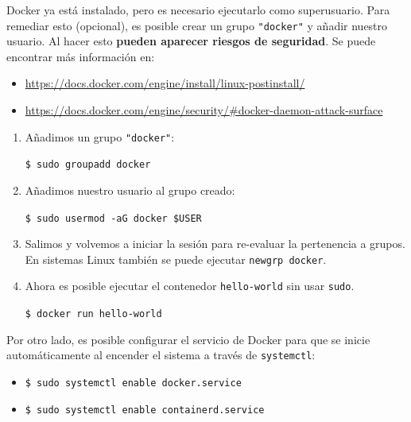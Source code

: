 Docker ya está instalado, pero es necesario ejecutarlo como superusuario. Para remediar esto (opcional), es posible crear un grupo \texttt{"docker"} y añadir nuestro usuario. Al hacer esto \textbf{pueden aparecer riesgos de seguridad}. Se puede encontrar más información en:

\begin{itemize}

\item \url{https://docs.docker.com/engine/install/linux-postinstall/}

\item \url{https://docs.docker.com/engine/security/#docker-daemon-attack-surface}

\end{itemize}


\begin{enumerate}

\item Añadimos un grupo \texttt{"docker"}:

\texttt{\$ sudo groupadd docker}

\item Añadimos nuestro usuario al grupo creado:

\texttt{\$ sudo usermod -aG docker \$USER}

\item Salimos y volvemos a iniciar la sesión para re-evaluar la pertenencia a grupos. En sistemas Linux también se puede ejecutar \texttt{newgrp docker}. 

\item Ahora es posible ejecutar el contenedor \texttt{hello-world} sin usar \texttt{sudo}.

\texttt{\$ docker run hello-world}


\end{enumerate}

Por otro lado, es posible configurar el servicio de Docker para que se inicie automáticamente al encender el sistema a través de \texttt{systemctl}:

\begin{itemize}

\item \texttt{\$ sudo systemctl enable docker.service}

\item \texttt{\$ sudo systemctl enable containerd.service}

\end{itemize}

